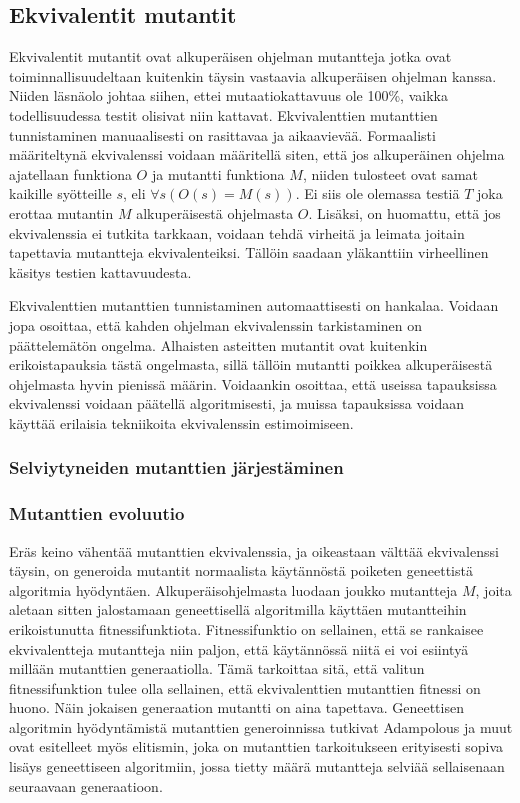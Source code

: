 \documentclass{tktltiki}
\begin{document}
\subsection{Ekvivalentit mutantit}
Ekvivalentit mutantit ovat alkuperäisen ohjelman mutantteja jotka ovat toiminnallisuudeltaan kuitenkin täysin vastaavia alkuperäisen ohjelman kanssa. Niiden läsnäolo johtaa siihen, ettei mutaatiokattavuus ole 100\%, vaikka todellisuudessa testit olisivat niin kattavat. Ekvivalenttien mutanttien tunnistaminen manuaalisesti on rasittavaa ja aikaavievää. Formaalisti määriteltynä ekvivalenssi voidaan määritellä siten, että jos alkuperäinen ohjelma ajatellaan funktiona $O$ ja mutantti funktiona $M$, niiden tulosteet ovat samat kaikille syötteille $s$, eli $\forall s(O(s) = M(s))$. Ei siis ole olemassa testiä $T$ joka erottaa mutantin $M$ alkuperäisestä ohjelmasta $O$. Lisäksi, on huomattu, että jos ekvivalenssia ei tutkita tarkkaan, voidaan tehdä virheitä ja leimata joitain tapettavia mutantteja ekvivalenteiksi. Tällöin saadaan yläkanttiin virheellinen käsitys testien kattavuudesta. %

Ekvivalenttien mutanttien tunnistaminen automaattisesti on hankalaa. Voidaan jopa osoittaa, että kahden ohjelman ekvivalenssin tarkistaminen on päättelemätön ongelma. Alhaisten asteitten mutantit ovat kuitenkin erikoistapauksia tästä ongelmasta, sillä tällöin mutantti poikkea alkuperäisestä ohjelmasta hyvin pienissä määrin. Voidaankin osoittaa, että useissa tapauksissa ekvivalenssi voidaan päätellä algoritmisesti, ja muissa tapauksissa voidaan käyttää erilaisia tekniikoita ekvivalenssin estimoimiseen. 

\subsubsection{Selviytyneiden mutanttien järjestäminen}

\subsubsection{Mutanttien evoluutio}
Eräs keino vähentää mutanttien ekvivalenssia, ja oikeastaan välttää ekvivalenssi täysin, on generoida mutantit normaalista käytännöstä poiketen geneettistä algoritmia hyödyntäen. Alkuperäisohjelmasta luodaan joukko mutantteja $M$, joita aletaan sitten jalostamaan geneettisellä algoritmilla käyttäen mutantteihin erikoistunutta fitnessifunktiota. Fitnessifunktio on sellainen, että se rankaisee ekvivalentteja mutantteja niin paljon, että käytännössä niitä ei voi esiintyä millään mutanttien generaatiolla. Tämä tarkoittaa sitä, että valitun fitnessifunktion tulee olla sellainen, että ekvivalenttien mutanttien fitnessi on huono. Näin jokaisen generaation mutantti on aina tapettava. Geneettisen algoritmin hyödyntämistä mutanttien generoinnissa tutkivat Adampolous ja muut ovat esitelleet myös elitismin, joka on mutanttien tarkoitukseen erityisesti sopiva lisäys geneettiseen algoritmiin, jossa tietty määrä mutantteja selviää sellaisenaan seuraavaan generaatioon.
\end{document}

